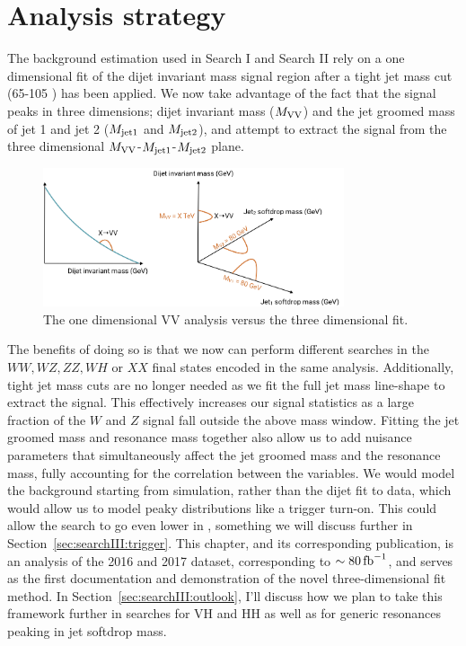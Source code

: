 \section{Analysis strategy}
The background estimation used in Search I and Search II rely on a one dimensional fit of the dijet invariant mass signal region after a tight jet mass cut (65-105 \GeV) has been applied.
We now take advantage of the fact that the signal peaks in three dimensions; dijet invariant mass ($M_{\rm VV}$) and the jet groomed mass of jet 1 and jet 2 ($M_{\rm jet1}$ and $M_{\rm jet2}$),
and attempt to extract the signal from the three dimensional $M_{\rm VV}$-$M_{\rm jet1}$-$M_{\rm jet2}$ plane.
\begin{figure}[h!] 
    \centering
    \includegraphics[width=0.79\textwidth]{figures/analysis/search3/misc/1Dvs3D.png}
    \caption{The one dimensional VV analysis versus the three dimensional fit.}
    \label{fig:searchIII:1Dvs3D}
\end{figure}
The benefits of doing so is that we now can perform different searches in the $WW, WZ, ZZ, WH$ or $XX$ final states encoded in the same analysis.
Additionally, tight jet mass cuts are no longer needed as we fit the full jet mass line-shape to extract the signal. This effectively increases our signal statistics
as a large fraction of the $W$ and $Z$ signal fall outside the above mass window.
Fitting the jet groomed mass and resonance mass together also allow us to add nuisance parameters that simultaneously affect the jet groomed mass and the resonance mass, fully accounting for the correlation between the variables.
We would model the background starting from simulation, rather than the dijet fit to data, which would allow us to model peaky distributions like a trigger turn-on. This could allow the search to go even lower in \MVV, something we will discuss further in Section~\ref{sec:searchIII:trigger}. \newline
This chapter, and its corresponding publication, is an analysis of the 2016 and 2017 dataset, corresponding to $\sim 80 \mbox{\ensuremath{\,\text{fb}^\text{$-$1}}}$, and serves as the first documentation and demonstration of the novel three-dimensional fit method. In Section~\ref{sec:searchIII:outlook}, I'll discuss how we plan to take this framework further in searches for VH and HH as well as for generic resonances peaking in jet softdrop mass.
